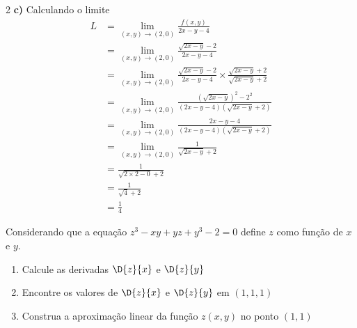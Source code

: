 \documentclass[a4paper,12pt,fleqn]{article}
\begin{document}
\begin{answer}
\begin{multicols*}{2}
\vspace{\baselineskip}
\textbf{c)\;}
Calculando o limite
\setlength{\jot}{12pt}
\setlength{\mathindent}{0cm}
\begin{align*}
  L
  & = \lim_{(x, y)\to(2, 0)} \frac{f(x, y)}{2x-y-4} \\
  & = \lim_{(x, y)\to(2, 0)} \frac{\sqrt{2x-y}-2}{2x-y-4} \\
  & = \lim_{(x, y)\to(2, 0)} \frac{\sqrt{2x-y}-2}{2x-y-4} \times
      \frac{\sqrt{2x-y}+2}{\sqrt{2x-y}+2} \\
  & = \lim_{(x, y)\to(2, 0)} \frac{\left(\sqrt{2x-y}\right)^2-2^2}
                                  {\left(2x-y-4\right)\left(\sqrt{2x-y}+2\right)} \\
  & = \lim_{(x, y)\to(2, 0)} \frac{2x-y-4}{\left(2x-y-4\right)\left(\sqrt{2x-y}+2\right)} \\
  & = \lim_{(x, y)\to(2, 0)} \frac{1}{\sqrt{2x-y}+2} \\
  & = \frac{1}{\sqrt{2\times 2-0}+2} \\
  & = \frac{1}{\sqrt{4} + 2} \\
  & = \frac{1}{4}
\end{align*}
\end{multicols*}
\end{answer}

Considerando que a equação
\(
  z^3 - xy + yz + y^3 - 2 = 0
\)
define $z$ como função de $x$ e $y$.
\begin{enumerate}[label=\alph*)]
  \item Calcule as derivadas \(\D{z}{x}\) e \(\D{z}{y}\)
  \item Encontre os valores de \(\D{z}{x}\) e \(\D{z}{y}\) em \((1, 1, 1)\)
  \item Construa a aproximação linear da função $z(x, y)$ no ponto \((1, 1)\)
\end{enumerate}
\clearpagequestiononly
\end{document}
